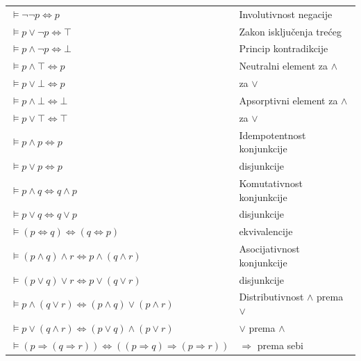 \begin{table}[!h]
\centering
\begin{tabular}{ll}
    $\vDash \lnot \lnot p \Leftrightarrow p$ & Involutivnost negacije\\
    $\vDash p \lor \lnot p \Leftrightarrow \top$ & Zakon isklju\v cenja tre\'ceg\\
    $\vDash p \land \lnot p \Leftrightarrow \bot$ & Princip kontradikcije\\
    \hline
    $\vDash p \land \top \Leftrightarrow p$ & Neutralni element za $\land$\\
    $\vDash p \lor \bot \Leftrightarrow p$ & \hphantom{Neutralni element}\llap{\dots} za $\lor$\\
    \hline
    $\vDash p \land \bot \Leftrightarrow \bot$ & Apsorptivni element za $\land$\\
    $\vDash p \lor \top \Leftrightarrow \top$ & \hphantom{Apsorptivni element}\llap{\dots} za $\lor$\\
    \hline
    $\vDash p \land p \Leftrightarrow p$ & Idempotentnost konjunkcije\\
    $\vDash p \lor p \Leftrightarrow p$ & \hphantom{Idempotentnost}\llap{\dots} disjunkcije\\
    \hline
    $\vDash p \land q \Leftrightarrow q \land p$ & Komutativnost konjunkcije\\
    $\vDash p \lor q \Leftrightarrow q \lor p$ & \hphantom{Komutativnost}\llap{\dots} disjunkcije\\
    $\vDash (p \Leftrightarrow q) \Leftrightarrow (q \Leftrightarrow p)$ & \hphantom{Komutativnost}\llap{\dots} ekvivalencije\\
    \hline
    $\vDash (p \land q) \land r \Leftrightarrow p \land (q \land r)$ & Asocijativnost konjunkcije\\
    $\vDash (p \lor q) \lor r \Leftrightarrow p \lor (q \lor r)$ & \hphantom{Asocijativnost}\llap{\dots} disjunkcije\\
    \hline
    $\vDash p \land (q \lor r) \Leftrightarrow (p \land q) \lor (p \land r)$ & Distributivnost $\land$ prema $\lor$\\
    $\vDash p \lor (q \land r) \Leftrightarrow (p \lor q) \land (p \lor r)$ & \hphantom{Distributivnost}\llap{\dots} $\lor$ prema $\land$\\
    $\vDash (p \Rightarrow (q \Rightarrow r)) \Leftrightarrow ((p \Rightarrow q) \Rightarrow (p \Rightarrow r))$ & \hphantom{Distributivnost}\llap{\dots} $\Rightarrow$ prema sebi\\
    \hline

\end{tabular}
\end{table}
